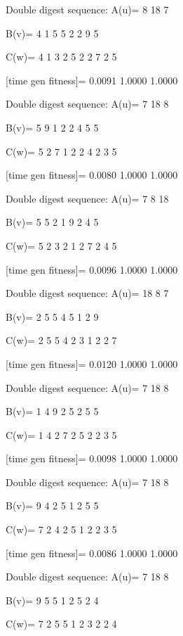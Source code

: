 Double digest sequence:
A(u)=
     8    18     7

B(v)=
     4     1     5     5     2     2     9     5

C(w)=
     4     1     3     2     5     2     2     7     2     5

[time gen fitness]=
    0.0091    1.0000    1.0000

Double digest sequence:
A(u)=
     7    18     8

B(v)=
     5     9     1     2     2     4     5     5

C(w)=
     5     2     7     1     2     2     4     2     3     5

[time gen fitness]=
    0.0080    1.0000    1.0000

Double digest sequence:
A(u)=
     7     8    18

B(v)=
     5     5     2     1     9     2     4     5

C(w)=
     5     2     3     2     1     2     7     2     4     5

[time gen fitness]=
    0.0096    1.0000    1.0000

Double digest sequence:
A(u)=
    18     8     7

B(v)=
     2     5     5     4     5     1     2     9

C(w)=
     2     5     5     4     2     3     1     2     2     7

[time gen fitness]=
    0.0120    1.0000    1.0000

Double digest sequence:
A(u)=
     7    18     8

B(v)=
     1     4     9     2     5     2     5     5

C(w)=
     1     4     2     7     2     5     2     2     3     5

[time gen fitness]=
    0.0098    1.0000    1.0000

Double digest sequence:
A(u)=
     7    18     8

B(v)=
     9     4     2     5     1     2     5     5

C(w)=
     7     2     4     2     5     1     2     2     3     5

[time gen fitness]=
    0.0086    1.0000    1.0000

Double digest sequence:
A(u)=
     7    18     8

B(v)=
     9     5     5     1     2     5     2     4

C(w)=
     7     2     5     5     1     2     3     2     2     4

